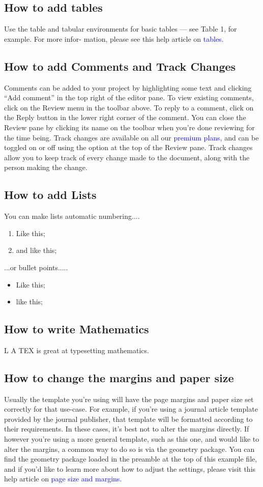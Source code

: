 \documentclass{article}
\begin{document}
	   \subsection{How to add tables}
	   
	   Use the table and tabular environments for basic tables — see Table 1, for example. For more infor-
	   mation, please see this help article on 
	   \textcolor{blue}{tables.}
	   \subsection{How to add Comments and Track Changes}
	   Comments can be added to your project by highlighting some text and clicking “Add comment” in
	   the top right of the editor pane. To view existing comments, click on the Review menu in the toolbar
	   above. To reply to a comment, click on the Reply button in the lower right corner of the comment.
	   You can close the Review pane by clicking its name on the toolbar when you’re done reviewing for the
	   time being.
	   Track changes are available on all our 
	   \textcolor{blue}{premium plans,} and can be toggled on or off using the option
	   at the top of the Review pane. Track changes allow you to keep track of every change made to the
	   document, along with the person making the change.
	   \subsection{How to add Lists}
	   You  can make lists automatic numbering....
	   \begin{enumerate}
	   	\item Like this;
	   	\item and like this;
	   	
	   \end{enumerate}
	   ...or bullet points.....
	   \begin{itemize}
	   	\item Like this;
	   	\item like this;
	   \end{itemize}
	   \subsection{How to write Mathematics}
	L A TEX is great at typesetting mathematics.
	\subsection{How to change the margins and paper size}
	Usually the template you’re using will have the page margins and paper size set correctly for that
	use-case. For example, if you’re using a journal article template provided by the journal publisher,
	that template will be formatted according to their requirements. In these cases, it’s best not to alter
	the margins directly.
	If however you’re using a more general template, such as this one, and would like to alter the
	margins, a common way to do so is via the geometry package. You can find the geometry package
	loaded in the preamble at the top of this example file, and if you’d like to learn more about how to
	adjust the settings, please visit this help article on \textcolor{blue}{page size and margins.}
	\newpage 
\end{document}
